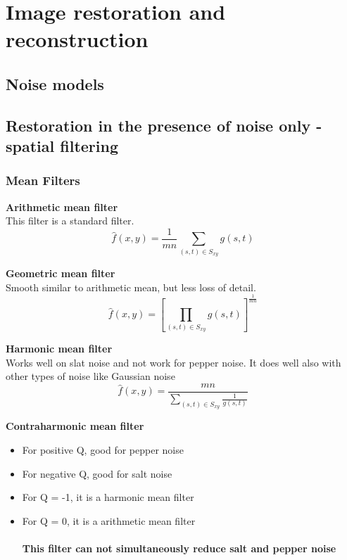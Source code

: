 \section{Image restoration and reconstruction }
\subsection{Noise models  }

\subsection{Restoration in the presence of noise only - spatial filtering }
\subsubsection{Mean Filters}

\textbf{Arithmetic mean filter}\\
This filter is a standard filter.
\begin{equation}
	\hat{f}(x,y)= \frac{1}{m  n} \sum\limits_{(s,t)\in S_{xy}}g(s,t)
\end{equation}

\textbf{Geometric mean filter}\\
Smooth similar to arithmetic mean, but less loss of detail.
\begin{equation}
	\hat{f}(x,y)= \left[\prod\limits_{(s,t)\in S_{xy}} g(s,t)\right]^\frac{1}{mn}
\end{equation}

\textbf{Harmonic mean filter}\\
Works well on slat noise and not work for pepper noise. It does well also with other types of noise like Gaussian noise
\begin{equation}
	\hat{f}(x,y)= \frac{mn}{\sum\limits_{(s,t)\in S_{xy}} \frac{1}{g(s,t)}}
\end{equation}

\textbf{Contraharmonic mean filter}\\
\begin{itemize}
\item For positive Q, good for pepper noise
\item For negative Q, good for salt noise
\item For Q = -1, it is a harmonic mean filter
\item For Q = 0, it is a arithmetic mean filter\\ \\
\textbf{This filter can not simultaneously reduce salt and pepper noise}
\end{itemize}

